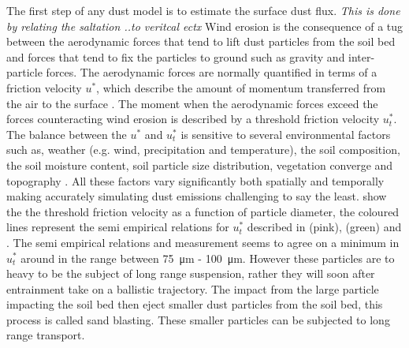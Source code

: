 The first step of any dust model is to estimate the surface dust flux. \emph{This is done by relating the saltation ..to veritcal ectx}  Wind erosion is the consequence of a tug between the aerodynamic forces that tend to lift dust particles from the soil bed and forces that tend to fix the particles to ground such as gravity and inter-particle forces. The aerodynamic forces are normally quantified in terms of a friction velocity $u^*$, which describe the amount of momentum transferred from the air to the surface \parencite{ShaoYaping2008PaMo}. The moment when the aerodynamic forces exceed the forces counteracting wind erosion is described by a threshold friction velocity $u^*_t$. The balance between the $u^*$ and $u^*_t$ is sensitive to several environmental factors such as, weather (e.g. wind, precipitation and temperature), the soil composition, the soil moisture content, soil particle size distribution, vegetation converge and topography . 
All these factors vary significantly both spatially and temporally making accurately simulating dust emissions challenging to say the least.  show the the threshold friction velocity as a function of particle diameter, the coloured lines represent the semi empirical relations for $u^*_t$ described in \textcite{iversen1982saltation} (pink), \textcite{shao2000simple} (green) and \textcite{bagnold1941physics}. The semi empirical relations and measurement seems to agree on a minimum in $u^*_t$ around in the range between  \SI{75}{\micro\metre} - \SI{100}{\micro\metre}. However these particles are to heavy to be the subject of long range suspension, rather they will soon after entrainment take on a ballistic trajectory. The impact from the large particle impacting the soil bed then eject smaller dust particles from the soil bed, this process is called sand blasting. These smaller particles can be subjected to long range transport. 

